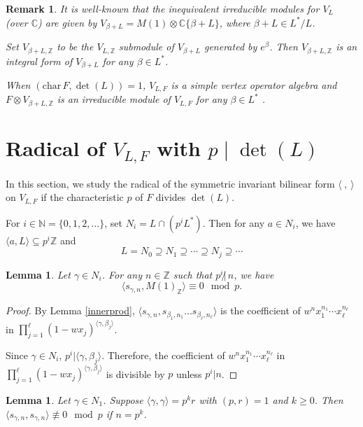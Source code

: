 \documentclass[12pt]{article}
\def\CC{{\mathbb C}}
\def\ZZ{{\mathbb Z}}
\def\NN{{\mathbb N}}
\newtheorem{lem}[thm]{Lemma}
\newtheorem{rem}[thm]{Remark}
\begin{document}
\begin{rem}\label{rem3.9}
It is well-known \cite{D} that the inequivalent irreducible modules for $V_L$ (over $\CC$) are given by 
$V_{\beta+L}= M(1) \otimes \CC\{\beta+L\}$, where $\beta+L \in L^*/L$. 

Set $V_{\beta+L, \ZZ}$ to be  the $V_{L,\ZZ}$ submodule of $V_{\beta+L}$ generated by $e^\beta$. 
Then  $V_{\beta+L, \ZZ}$ is an integral form of $V_{\beta+L}$ for any $\beta\in L^*$. 

When $(\mathrm{char}\,F, \det(L))=1$, $V_{L,F}$ is a simple vertex operator algebra and 
$F\otimes V_{\beta+L, \ZZ}$ is an irreducible module
of $V_{L,F}$  for any $\beta\in L^*$ \cite{Mu}. 	
\end{rem}

\section{Radical of $V_{L,F}$ with $p\mid \det(L)$} 
In this section, we study the radical of the symmetric invariant bilinear form $\langle\ ,\ \rangle$ on $V_{L,F}$ if the characteristic $p$  of $F$ divides $\det(L)$.

For $i\in \NN=\{0,1,2, \dots\}$,  
set  $N_i= L\cap (p^iL^*)$. Then   for any $a\in N_i$, we have $\langle a, L\rangle \subseteq p^i \ZZ$ and \[
L=N_0 \supseteq N_1\supseteq \cdots \supseteq N_j \supseteq \cdots 
\] 


\begin{lem}\label{sRi}
Let $\gamma \in N_i$. For any $n\in \ZZ$ such that $p^i\not|\,n$, we have 
\[
\langle s_{\gamma,n}, M(1)_\ZZ\rangle \equiv 0  \mod p. 
\]
\end{lem}

\begin{proof}
By Lemma \ref{innerprod},  
$\langle s_{\gamma,n}, s_{\beta_1,n_1} \dots s_{\beta_\ell,n_\ell} \rangle $
is the coefficient of $w^{n} x_1^{n_1} \cdots x_\ell^{n_{\ell}} $ in $\prod_{j=1}^\ell (1-wx_j)^{\langle \gamma, \beta_j \rangle}$. 

Since  $\gamma \in N_i$, $p^i| {\langle \gamma, \beta_j \rangle}$.  
Therefore, the coefficient of  $w^{n} x_1^{n_1} \cdots x_\ell^{n_{\ell}} $ in $\prod_{j=1}^\ell (1-wx_j)^{\langle \gamma, \beta_j \rangle}$ is divisible by $p$  unless
$p^i | n$. 
\end{proof}


\begin{lem}\label{nzero}
Let $\gamma \in N_1$. Suppose $\langle \gamma, \gamma\rangle =p^k r$ with $(p,r)=1$ and $k\ge 0$. 
Then $\langle s_{\gamma,n}, s_{\gamma,n}\rangle \not \equiv 0 \mod p$ if $n=p^k$. 
\end{lem}
\end{document}
